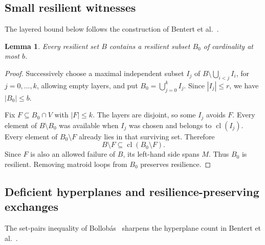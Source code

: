 \documentclass[11pt]{article}
\newtheorem{lemma}[theorem]{Lemma}
\theoremstyle{definition}
\theoremstyle{remark}\newtheorem{remark}[theorem]{Remark}
\DeclareMathOperator{\cl}{cl}
\begin{document}
\subsection{Small resilient witnesses}
The layered bound below follows the construction of Bentert
et al.~\cite[Proposition~6]{BFGL}.
\begin{lemma}\label{lem:small}
Every resilient set $B$ contains a resilient subset $B_0$ of cardinality at most $b$.
\end{lemma}
\begin{proof}
Successively choose a maximal independent subset $I_j$ of $B\setminus\bigcup_{i<j}I_i$, for $j=0,\ldots,k$, allowing empty layers, and put
$B_0=\bigcup_{j=0}^{k}I_j$. Since $|I_j|\leq r$, we have $|B_0|\leq b$.

Fix $F\subseteq B_0\cap V$ with $|F|\leq k$. The layers are disjoint, so some $I_j$ avoids $F$. Every element of $B\setminus B_0$ was available when $I_j$ was chosen and belongs to $\cl(I_j)$. Every element of $B_0\setminus F$ already lies in that surviving set. Therefore
\[
 B\setminus F\subseteq \cl(B_0\setminus F).
\]
Since $F$ is also an allowed failure of $B$, its left-hand side spans $M$. Thus $B_0$ is resilient. Removing matroid loops from $B_0$ preserves resilience.
\end{proof}

\subsection{Deficient hyperplanes and resilience-preserving exchanges}
The set-pairs inequality of Bollob\'as~\cite{Bollobas}
sharpens the hyperplane count in Bentert et al.~\cite[Lemma~8]{BFGL}.
\end{document}
